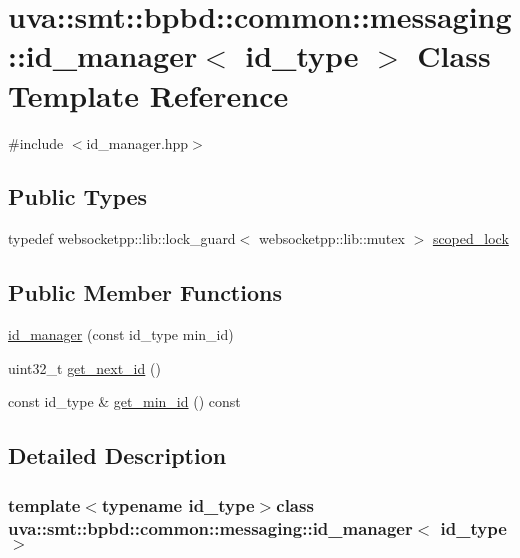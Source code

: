 \hypertarget{classuva_1_1smt_1_1bpbd_1_1common_1_1messaging_1_1id__manager}{}\section{uva\+:\+:smt\+:\+:bpbd\+:\+:common\+:\+:messaging\+:\+:id\+\_\+manager$<$ id\+\_\+type $>$ Class Template Reference}
\label{classuva_1_1smt_1_1bpbd_1_1common_1_1messaging_1_1id__manager}


{\ttfamily \#include $<$id\+\_\+manager.\+hpp$>$}

\subsection*{Public Types}
\begin{DoxyCompactItemize}
\item 
typedef websocketpp\+::lib\+::lock\+\_\+guard$<$ websocketpp\+::lib\+::mutex $>$ \hyperlink{classuva_1_1smt_1_1bpbd_1_1common_1_1messaging_1_1id__manager_aafd78a96c08b99a2d2ad36d75cfcb7e9}{scoped\+\_\+lock}
\end{DoxyCompactItemize}
\subsection*{Public Member Functions}
\begin{DoxyCompactItemize}
\item 
\hyperlink{classuva_1_1smt_1_1bpbd_1_1common_1_1messaging_1_1id__manager_a393d90137186010617fe08c58a800c87}{id\+\_\+manager} (const id\+\_\+type min\+\_\+id)
\item 
uint32\+\_\+t \hyperlink{classuva_1_1smt_1_1bpbd_1_1common_1_1messaging_1_1id__manager_ab1d5aaded757f7a949a9a72738d880fb}{get\+\_\+next\+\_\+id} ()
\item 
const id\+\_\+type \& \hyperlink{classuva_1_1smt_1_1bpbd_1_1common_1_1messaging_1_1id__manager_ac54860dad06da844e94ec196905ee4d0}{get\+\_\+min\+\_\+id} () const 
\end{DoxyCompactItemize}


\subsection{Detailed Description}
\subsubsection*{template$<$typename id\+\_\+type$>$class uva\+::smt\+::bpbd\+::common\+::messaging\+::id\+\_\+manager$<$ id\+\_\+type $>$}

